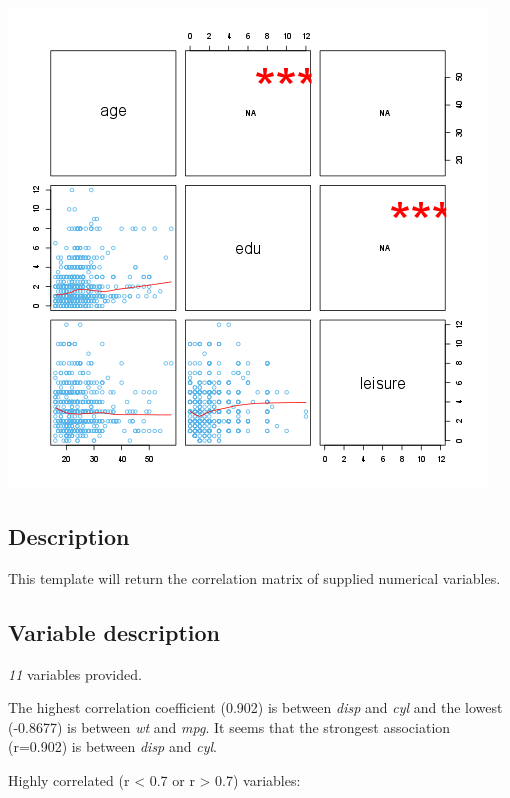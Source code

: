 \documentclass[]{article}
\makeatletter
\def\maxwidth{\ifdim\Gin@nat@width>\linewidth\linewidth
\else\Gin@nat@width\fi}
\let\Oldincludegraphics\includegraphics
\renewcommand{\includegraphics}[1]{\Oldincludegraphics[width=\maxwidth]{#1}}
\makeatother
\begin{document}
\href{0e4cca7017b21223d68df3b9e300c895-hires.png}{\includegraphics{0e4cca7017b21223d68df3b9e300c895.png}}

\subsection{Description}

This template will return the correlation matrix of supplied numerical
variables.

\subsection{Variable description}

\emph{11} variables provided.

The highest correlation coefficient (0.902) is between \emph{disp} and
\emph{cyl} and the lowest (-0.8677) is between \emph{wt} and \emph{mpg}.
It seems that the strongest association (r=0.902) is between \emph{disp}
and \emph{cyl}.

Highly correlated (r \textless{} 0.7 or r \textgreater{} 0.7) variables:
\end{document}
